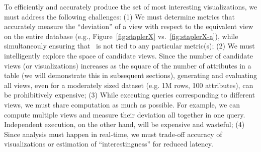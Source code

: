 To efficiently and accurately produce the set of most interesting
visualizations, we must address the following challenges: 
(1) We must determine
metrics that accurately measure the ``deviation'' of a view with respect to the equivalent view on the entire database (e.g.,
Figure~\ref{fig:staplerX} vs.~\ref{fig:staplerX-a}), while simultaneouly
ensuring that \SeeDB\ is not tied to any particular metric(s); 
(2)  We must
intelligently explore the space of candidate views. Since the number of
candidate views (or visualizations) increases as the square of the number of
attributes in a table (we will demonstrate this in subsequent sections),
generating and evaluating all views, even for a moderately sized dataset (e.g.
1M rows, 100 attributes), can be prohibitively expensive;
(3) While executing queries corresponding to different views, we must share
computation as much as possible. For example, 
we can compute multiple views and measure their deviation 
all together in one query. Independent execution,
on the other hand, will be expensive and wasteful;
(4) Since
analysis must happen in real-time, we must trade-off accuracy
of visualizations or estimation of ``interestingness'' for reduced latency.


